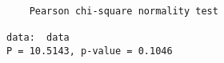 \begin{verbatim} 

	Pearson chi-square normality test

data:  data
P = 10.5143, p-value = 0.1046

\end{verbatim}